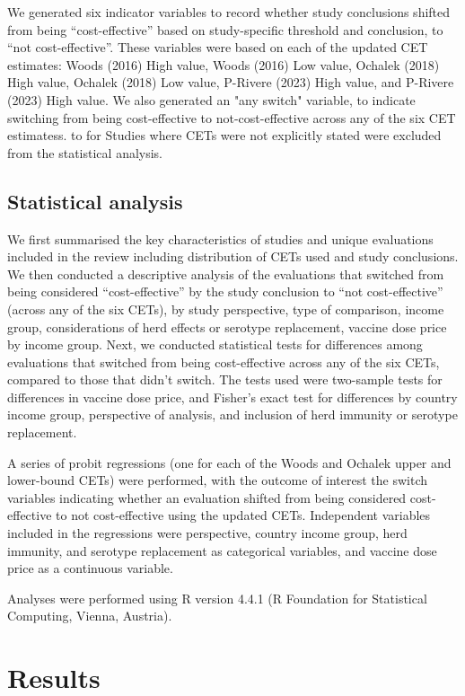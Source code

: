 \documentclass[12pt]{article}
\begin{document}
 We generated six indicator variables to record whether study conclusions shifted from being “cost-effective” based on study-specific threshold and conclusion, to “not cost-effective”. These variables were based on each of the updated CET estimates: Woods (2016) High value, Woods (2016) Low value, Ochalek (2018) High value, Ochalek (2018) Low value, P-Rivere (2023) High value, and P-Rivere (2023) High value. We also generated an "any switch" variable, to indicate switching from being cost-effective to not-cost-effective across any of the six CET estimatess. to for  Studies where CETs were not explicitly stated were excluded from the statistical analysis.

\subsection{Statistical analysis}
We first summarised the key characteristics of studies and unique evaluations included in the review including distribution of CETs used and study conclusions. We then conducted a descriptive analysis of the evaluations that switched from being considered “cost-effective” by the study conclusion to “not cost-effective” (across any of the six CETs), by study perspective, type of comparison, income group, considerations of herd effects or serotype replacement, vaccine dose price by income group. Next, we conducted statistical tests for differences among evaluations that switched from being cost-effective across any of the six CETs, compared to those that didn’t switch. The tests used were two-sample tests for differences in vaccine dose price, and Fisher's exact test for differences by country income group, perspective of analysis, and inclusion of herd immunity or serotype replacement.

A series of probit regressions (one for each of the Woods and Ochalek upper and lower-bound CETs) were performed, with the outcome of interest the switch variables indicating whether an evaluation shifted from being considered cost-effective to not cost-effective using the updated CETs. Independent variables included in the regressions were perspective, country income group, herd immunity, and serotype replacement as categorical variables, and vaccine dose price as a continuous variable.

Analyses were performed using R version 4.4.1 (R Foundation for Statistical Computing, Vienna, Austria). 

\section{Results}
\end{document}

